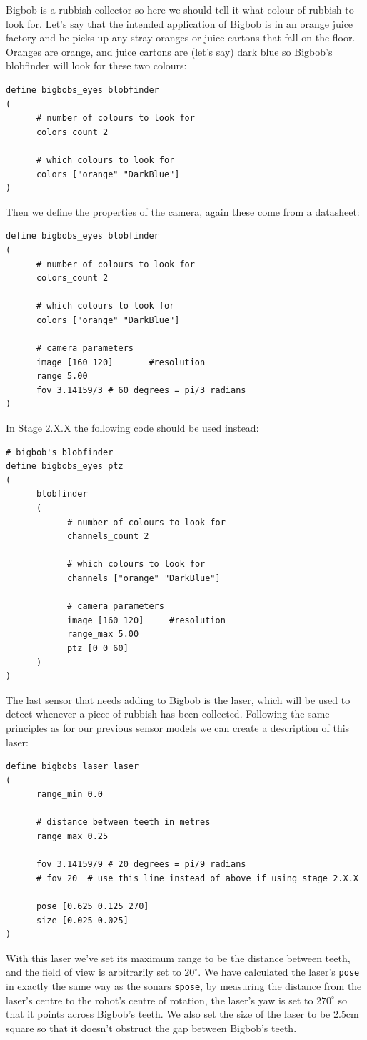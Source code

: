 \documentclass[a4paper]{article}
\begin{document}
Bigbob is a rubbish-collector so here we should tell it what colour of rubbish to look for. Let's say that the intended application of Bigbob is in an orange juice factory and he picks up any stray oranges or juice cartons that fall on the floor. Oranges are orange, and juice cartons are (let's say) dark blue so Bigbob's blobfinder will look for these two colours:
\begin{verbatim}
define bigbobs_eyes blobfinder
(
      # number of colours to look for
      colors_count 2
      
      # which colours to look for
      colors ["orange" "DarkBlue"]
)
\end{verbatim}
Then we define the properties of the camera, again these come from a datasheet:
\begin{verbatim}
define bigbobs_eyes blobfinder
(
      # number of colours to look for
      colors_count 2
      
      # which colours to look for
      colors ["orange" "DarkBlue"]

      # camera parameters
      image [160 120]		#resolution
      range 5.00
      fov 3.14159/3	# 60 degrees = pi/3 radians
)
\end{verbatim}
In Stage 2.X.X the following code should be used instead:
\begin{verbatim}
# bigbob's blobfinder
define bigbobs_eyes ptz
(
      blobfinder
      (
            # number of colours to look for
            channels_count 2

            # which colours to look for
            channels ["orange" "DarkBlue"]
	
            # camera parameters
            image [160 120]		#resolution
            range_max 5.00
            ptz [0 0 60]
      )
)
\end{verbatim}

The last sensor that needs adding to Bigbob is the laser, which will be used to detect whenever a piece of rubbish has been collected. Following the same principles as for our previous sensor models we can create a description of this laser:
\begin{verbatim}
define bigbobs_laser laser
(
      range_min 0.0
	
      # distance between teeth in metres
      range_max 0.25
	
      fov 3.14159/9	# 20 degrees = pi/9 radians
      # fov 20	# use this line instead of above if using stage 2.X.X
      
      pose [0.625 0.125 270]
      size [0.025 0.025]
)
\end{verbatim}
With this laser we've set its maximum range to be the distance between teeth, and the field of view is arbitrarily set to $20^{\circ}$. We have calculated the laser's \verb|pose| in exactly the same way as the sonars \verb|spose|, by measuring the distance from the laser's centre to the robot's centre of rotation, the laser's yaw is set to $270^{\circ}$ so that it points across Bigbob's teeth. We also set the size of the laser to be 2.5cm square so that it doesn't obstruct the gap between Bigbob's teeth.
\end{document}
